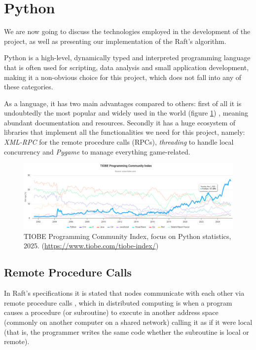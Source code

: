 \section{Python} \label{sec:python}

We {are now going to discuss} the technologies employed in the development of the project, as well as presenting our implementation of the Raft's algorithm.

Python is a high-level, dynamically typed and interpreted programming language that is often used for scripting, data analysis and small application development, making it a non-obvious choice for this project, which does not fall into any of these categories.

As a language, it has two main advantages compared to others: first of all it is undoubtedly the most popular and widely used in the world (figure \ref{fig:tiobe}) \cite{tiobe,ieeeSpect}, meaning abundant documentation and resources. Secondly it has a huge ecosystem of libraries that implement all the functionalities we need for this project, namely: \textit{XML-RPC} for the remote procedure calls (RPCs), \textit{threading} to handle local concurrency and \textit{Pygame} to manage everything game-related.

\begin{figure}[h]
  \centering
  \includegraphics[width=\linewidth]{images/TIOBEindex.png}
  \caption{TIOBE Programming Community Index, focus on Python statistics, 2025. (\url{https://www.tiobe.com/tiobe-index/})}
  \label{fig:tiobe}
\end{figure}


\subsection{Remote Procedure Calls} \label{sec:xmlrpc}

In Raft's specifications it is stated that nodes communicate with each other via remote procedure calls \cite{raft}, which in distributed computing is when a program causes a procedure (or subroutine) to execute in another address space (commonly on another computer on a shared network) calling it as if it were local (that is, the programmer writes the same code whether the subroutine is local or remote).

